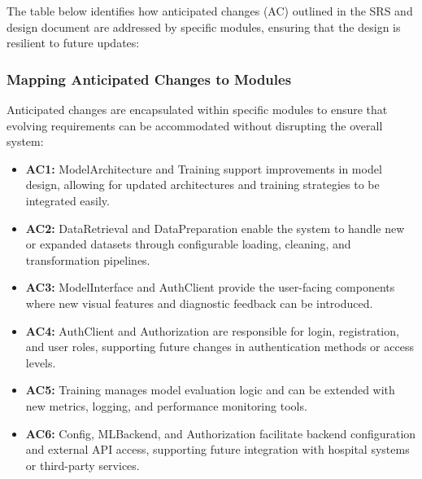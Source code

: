 \documentclass[12pt, titlepage]{article}
\begin{document}
The table below identifies how anticipated changes (AC) outlined in the SRS and design document are addressed by specific modules, ensuring that the design is resilient to future updates:

\begin{table}[H]
\centering
{}
\caption{Traceability Between Anticipated Changes and Modules}
\label{TblACTM}
\end{table}

\subsubsection{Mapping Anticipated Changes to Modules}
Anticipated changes are encapsulated within specific modules to ensure that evolving requirements can be accommodated without disrupting the overall system:

\begin{itemize}
    \item \textbf{AC1:} ModelArchitecture and Training support improvements in model design, allowing for updated architectures and training strategies to be integrated easily.
    \item \textbf{AC2:} DataRetrieval and DataPreparation enable the system to handle new or expanded datasets through configurable loading, cleaning, and transformation pipelines.
    \item \textbf{AC3:} ModelInterface and AuthClient provide the user-facing components where new visual features and diagnostic feedback can be introduced.
    \item \textbf{AC4:} AuthClient and Authorization are responsible for login, registration, and user roles, supporting future changes in authentication methods or access levels.
    \item \textbf{AC5:} Training manages model evaluation logic and can be extended with new metrics, logging, and performance monitoring tools.
    \item \textbf{AC6:} Config, MLBackend, and Authorization facilitate backend configuration and external API access, supporting future integration with hospital systems or third-party services.
\end{itemize}
\end{document}
